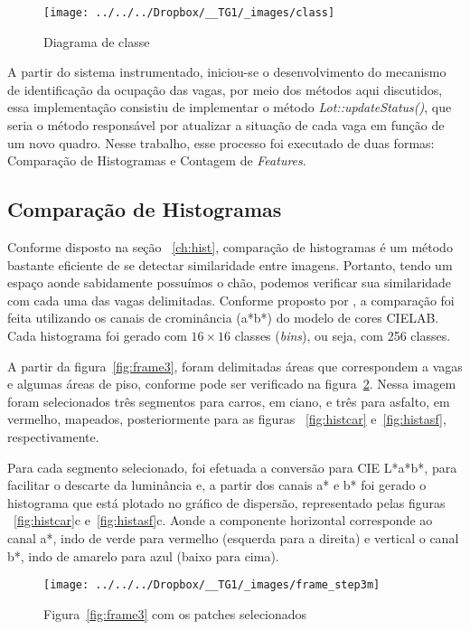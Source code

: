 \documentclass[ecp,tc]{iiufrgs}
\begin{document}
\begin{figure}
	\centering
	\caption{Diagrama de classe}
	\texttt{[image: ../../../Dropbox/\_\_TG1/\_images/class]}
	\label{fig:class}
\end{figure}

A partir do sistema instrumentado, iniciou-se o desenvolvimento do mecanismo de identificação da ocupação das vagas, por meio dos métodos aqui discutidos, essa implementação consistiu de implementar o método \textit{Lot::updateStatus()}, que seria o método responsável por atualizar a situação de cada vaga em função de um novo quadro. Nesse trabalho, esse processo foi executado de duas formas: Comparação de Histogramas e Contagem de \textit{Features}.

\subsection{Comparação de Histogramas}

Conforme disposto na seção ~\ref{ch:hist}, comparação de histogramas é um método bastante eficiente de se detectar similaridade entre imagens. Portanto, tendo um espaço aonde sabidamente possuímos o chão, podemos verificar sua similaridade com cada uma das vagas delimitadas. Conforme proposto por , a comparação foi feita utilizando os canais de crominância (a*b*) do modelo de cores CIELAB. Cada 
histograma foi gerado com $ 16 \times 16 $ classes (\textit{bins}), ou seja, com 256 classes.

A partir da figura~\ref{fig:frame3}, foram delimitadas áreas que correspondem a vagas e algumas áreas de piso, conforme pode ser verificado na figura~\ref{fig:framemark}. Nessa imagem foram selecionados três segmentos para carros, em ciano, e três para asfalto, em vermelho, mapeados, posteriormente para as figuras ~\ref{fig:histcar} e~\ref{fig:histasf}, respectivamente.

Para cada segmento selecionado, foi efetuada a conversão para CIE L*a*b*, para facilitar o descarte da luminância e, a partir dos canais a* e b* foi gerado o histograma que está plotado no gráfico de dispersão, representado pelas figuras ~\ref{fig:histcar}c e~\ref{fig:histasf}c. Aonde a componente horizontal corresponde ao canal a*, indo de verde para vermelho (esquerda para a direita) e vertical o canal b*, indo de amarelo para azul (baixo para cima).

\begin{figure}
	\centering
	\caption{Figura~\ref{fig:frame3} com os patches selecionados}
	\texttt{[image: ../../../Dropbox/\_\_TG1/\_images/frame\_step3m]}
	\label{fig:framemark}
\end{figure}
\end{document}
